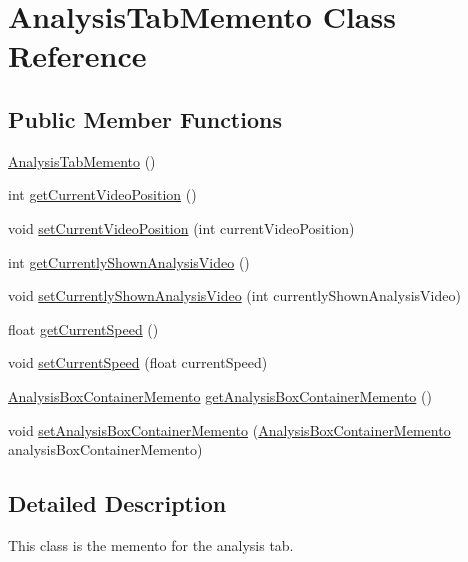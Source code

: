\hypertarget{classAnalysisTabMemento}{}\section{Analysis\+Tab\+Memento Class Reference}
\label{classAnalysisTabMemento}
\subsection*{Public Member Functions}
\begin{DoxyCompactItemize}
\item 
\hyperlink{classAnalysisTabMemento_a035f84d6066cdb7d8a475da4710d2e67}{Analysis\+Tab\+Memento} ()
\item 
int \hyperlink{classAnalysisTabMemento_af7babc742dcea9250c73c408b2cfacf2}{get\+Current\+Video\+Position} ()
\item 
void \hyperlink{classAnalysisTabMemento_a66ff926aa567b15381b5906cd65c6b7d}{set\+Current\+Video\+Position} (int current\+Video\+Position)
\item 
int \hyperlink{classAnalysisTabMemento_a687a0fc92408cf713058eaf23abc22f3}{get\+Currently\+Shown\+Analysis\+Video} ()
\item 
void \hyperlink{classAnalysisTabMemento_a1d76537f6e47c09e47bf15eefd26feff}{set\+Currently\+Shown\+Analysis\+Video} (int currently\+Shown\+Analysis\+Video)
\item 
float \hyperlink{classAnalysisTabMemento_a4c7df241ee5989199664bfc3b336d228}{get\+Current\+Speed} ()
\item 
void \hyperlink{classAnalysisTabMemento_aa99f3e18fe8363d1333c1ddedfa12084}{set\+Current\+Speed} (float current\+Speed)
\item 
\hyperlink{classAnalysisBoxContainerMemento}{Analysis\+Box\+Container\+Memento} \hyperlink{classAnalysisTabMemento_a0b45e8f1c50789442a871c88f9dca409}{get\+Analysis\+Box\+Container\+Memento} ()
\item 
void \hyperlink{classAnalysisTabMemento_a5fe10df7d94b9d526646b150254b7480}{set\+Analysis\+Box\+Container\+Memento} (\hyperlink{classAnalysisBoxContainerMemento}{Analysis\+Box\+Container\+Memento} analysis\+Box\+Container\+Memento)
\end{DoxyCompactItemize}


\subsection{Detailed Description}
This class is the memento for the analysis tab. 

